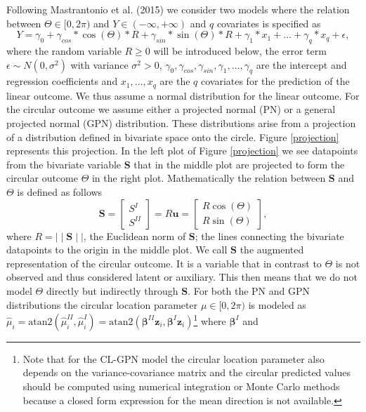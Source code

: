 \documentclass[man]{apa6}
\let\rmarkdownfootnote\footnote%
\def\footnote{\protect\rmarkdownfootnote}
\begin{document}
Following Mastrantonio et al. (2015) we consider two models where
the relation between \(\Theta \in [0, 2\pi)\) and \(Y\in (-\infty, + \infty)\)
and \(q\) covariates is specified as
\begin{equation}\label{circlinlink}
Y = \gamma_0 + \gamma_{cos}*\cos(\Theta)*R + \gamma_{sin}*\sin(\Theta)*R + \gamma_1*x_1 + \dots + \gamma_q*x_q +  \epsilon,
\end{equation}
\noindent where the random variable \(R\geq0\) will be introduced below, the
error term \(\epsilon \sim N(0, \sigma^2)\) with variance \(\sigma^2>0\),
\(\gamma_0, \gamma_{cos}, \gamma_{sin}, \gamma_1, \dots, \gamma_q\) are the
intercept and regression coefficients and \(x_1, \dots, x_q\) are the \(q\)
covariates for the prediction of the linear outcome. We thus assume a normal
distribution for the linear outcome.\newline
\indent For the circular outcome we assume either a projected normal (PN) or a
general projected normal (GPN) distribution. These distributions arise from a
projection of a distribution defined in bivariate space onto the circle. Figure
\ref{projection} represents this projection. In the left plot of Figure
\ref{projection} we see datapoints from the bivariate variable
\(\boldsymbol{S}\) that in the middle plot are projected to form the circular
outcome \(\Theta\) in the right plot. Mathematically the relation between
\(\boldsymbol{S}\) and \(\Theta\) is defined as follows
\begin{equation}\label{projection}
\boldsymbol{S} = \begin{bmatrix} S^{I} \\ S^{II} \end{bmatrix} = R\boldsymbol{u} = \begin{bmatrix} R \cos (\Theta) \\  R\sin (\Theta) \end{bmatrix},
\end{equation}
\noindent where \(R = \mid\mid \boldsymbol{S} \mid\mid\), the Euclidean norm of
\(\boldsymbol{S}\); the lines connecting the bivariate datapoints to the origin
in the middle plot. We call \(\boldsymbol{S}\) the augmented representation of the
circular outcome. It is a variable that in contrast to \(\Theta\) is not
observed and thus considered latent or auxiliary. This then means that we do not
model \(\Theta\) directly but indirectly through \(\boldsymbol{S}\). \newline
\indent For both the PN and GPN distributions the circular location parameter
\(\mu\in [0, 2\pi)\) is modeled as \(\hat{\mu}_i = \mbox{atan2}(\hat{\mu}_i^{II}, \hat{\mu}_i^{I}) = \mbox{atan2}(\boldsymbol{\beta}^{II}\boldsymbol{z}_i, \boldsymbol{\beta}^{I}\boldsymbol{z}_i)\)\footnote{Note that for the CL-GPN
model the circular location parameter also depends on the variance-covariance
matrix and the circular predicted values should be computed using numerical
integration or Monte Carlo methods because a closed form expression for the mean
direction is not available.} where \(\boldsymbol{\beta}^{I}\) and
\end{document}
